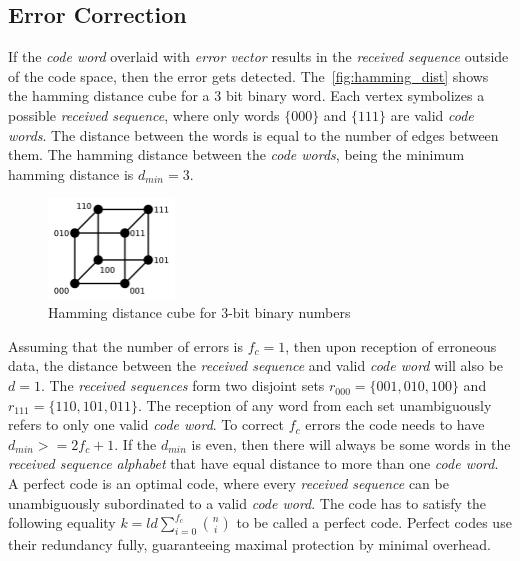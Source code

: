 \subsection{Error Correction}
If the \textit{code word} overlaid with \textit{error vector} results in the \textit{received sequence} outside of the code space, then the error gets detected. The~\autoref{fig:hamming_dist} shows the hamming distance cube for a 3 bit binary word. Each vertex symbolizes a possible \textit{received sequence}, where only words $\{000\}$ and $\{111\}$ are valid \textit{code words}. The distance between the words is equal to the number of edges between them. The hamming distance between the \textit{code words}, being the minimum hamming distance is $d_{min}=3$.

\begin{figure}[H]
\centering
\includegraphics[width=0.3\textwidth]{figures/Hamming_distance.png}
\caption{Hamming distance cube for 3-bit binary numbers~\cite{web:hamming_dist}}
\label{fig:hamming_dist}
\end{figure}

Assuming that the number of errors is $f_c = 1$, then upon reception of erroneous data, the distance between the \textit{received sequence} and valid \textit{code word} will also be $d = 1$. The \textit{received sequences} form two disjoint sets $r_{000}=\{001,010,100\}$ and $r_{111}=\{110,101,011\}$. The reception of any word from each set unambiguously refers to only one valid \textit{code word}. To correct $f_c$ errors the code needs to have $d_{min} >= 2f_c+1$. If the $d_{min}$ is even, then there will always be some words in the \textit{received sequence alphabet} that have equal distance to more than one \textit{code word}. A perfect code is an optimal code, where every \textit{received sequence} can be unambiguously subordinated to a valid \textit{code word}. The code has to satisfy the following equality $k=ld\sum_{i=0}^{f_c} {n \choose i}$ to be called a perfect code. Perfect codes use their redundancy fully, guaranteeing maximal protection by minimal overhead.


